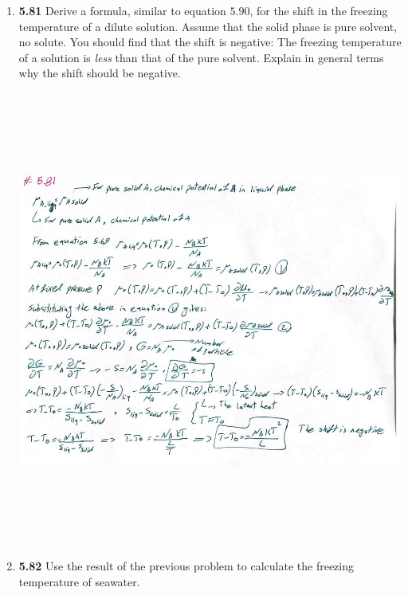 \documentclass[fleqn]{article}
\begin{document}
  \begin{enumerate}
    \item \textbf{5.81} Derive a formula, similar to equation $5.90$, for the shift in the freezing 
    temperature of a dilute solution. Assume that the solid phase is pure solvent, no solute. You should
    find that the shift is negative: The freezing temperature of a solution is \emph{less} than that
    of the pure solvent. Explain in general terms why the shift should be negative.

      \begin{center}
        \includegraphics[height=15cm, width=16cm]{581.JPG}
      \end{center}
    
    \pagebreak

    \item \textbf{5.82} Use the result of the previous problem to calculate the freezing temperature
    of seawater.


\end{enumerate}
\end{document}
